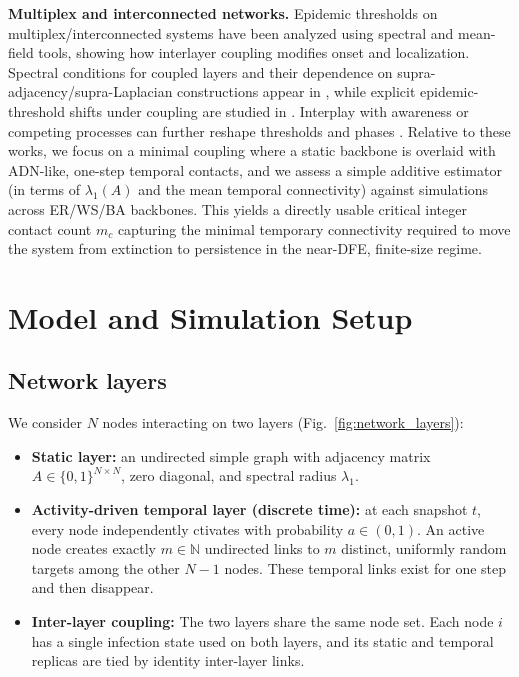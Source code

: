 \documentclass[pdflatex,sn-mathphys-num]{sn-jnl}%
\theoremstyle{thmstyleone}%
\theoremstyle{thmstyletwo}%
\theoremstyle{thmstylethree}%
\begin{document}
\textbf{Multiplex and interconnected networks.}
Epidemic thresholds on multiplex/interconnected systems have been analyzed using spectral and mean-field tools, showing how interlayer coupling modifies onset and localization.
Spectral conditions for coupled layers and their dependence on supra-adjacency/supra-Laplacian constructions appear in \cite{Kivela2014,DeDomenico2013,Gomez2013}, while explicit epidemic-threshold shifts under coupling are studied in \cite{SahnehScoglio2013ACC,WangPRE2013,Buono2014}.
Interplay with awareness or competing processes can further reshape thresholds and phases \cite{Granell2013,Arruda2017}.
Relative to these works, we focus on a minimal coupling where a static backbone is overlaid with ADN-like, one-step temporal contacts, and we assess a simple additive estimator (in terms of $\lambda_1(A)$ and the mean temporal connectivity) against simulations across ER/WS/BA backbones.
This yields a directly usable critical integer contact count $m_c$ capturing the minimal temporary connectivity required to move the system from extinction to persistence in the near-DFE, finite-size regime.


\section{Model and Simulation Setup}
\label{sec:model}

\subsection{Network layers}
We consider $N$ nodes interacting on two layers (Fig.~\ref{fig:network_layers}):
\begin{itemize}
  \item \textbf{Static layer:} an undirected simple graph with adjacency matrix $A\in\{0,1\}^{N\times N}$, zero diagonal, and spectral radius $\lambda_1$.
  \item \textbf{Activity-driven temporal layer (discrete time):} at each snapshot $t$, every node independently ctivates with probability $a\in(0,1)$. An active node creates exactly $m\in\mathbb{N}$ undirected links to $m$ distinct, uniformly random targets among the other $N-1$ nodes. These temporal links exist for one step and then disappear.
  \item \textbf{Inter-layer coupling:} The two layers share the same node set. Each node \(i\) has a single infection state used on both layers, and its static and temporal replicas are tied by identity inter-layer links.
\end{itemize}
\end{document}
